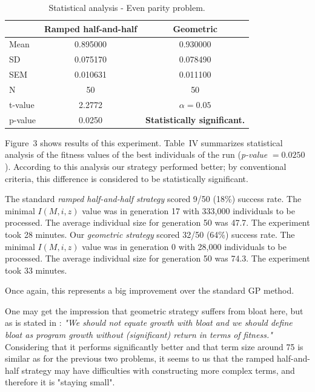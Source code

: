 \documentclass[conference]{IEEEtran}
\begin{document}
\begin{table}[!t]
\caption{Statistical analysis - Even parity problem.}
\centering
\begin{tabular}{|l|cc|}
\hline
& Ramped half-and-half & Geometric \\
\hline
Mean & 0.895000	& 0.930000 \\
SD	 & 0.075170	& 0.078490 \\
SEM	 & 0.010631	& 0.011100 \\
N	 & 50    & 50    \\
\hline
t-value &  2.2772 & $\alpha = 0.05$\\
p-value &  0.0250 &  \textbf{Statistically significant.}\\
\hline
\end{tabular}
\end{table}

Figure~3 shows results of this experiment. 
Table~IV summarizes statistical analysis
of the fitness values of the best individuals of the run 
(\textit{p-value} $ = 0.0250$).  
According to this analysis our strategy performed better;
by conventional criteria, this difference is considered to be 
statistically significant.

The standard \textit{ramped half-and-half strategy} scored 9/50 (18\%) success rate. 
The minimal $I(M,i,z)$ value was in generation 17 with 333,000 individuals to be processed.
The average individual size for generation 50 was 47.7.
The experiment took 28 minutes.
Our \textit{geometric strategy} scored 32/50 (64\%) success rate. 
The minimal $I(M,i,z)$ value was in generation 0 with 28,000 individuals to be processed.
The average individual size for generation 50 was 74.3.
The experiment took 33 minutes.

Once again, this represents a big improvement over the standard GP method. 

One may get the impression that geometric strategy 
suffers from bloat here, but as is stated in \cite{fg}: 
\textit{"We should not equate growth with bloat
and we should define bloat as program growth without 
(significant) return in terms of fitness."}
Considering that it performs significantly better and
that term size around 75 is similar as for the previous two problems, 
it seems to us that the ramped half-and-half strategy may have difficulties with 
constructing more complex terms, and therefore it is "staying small".
\end{document}

